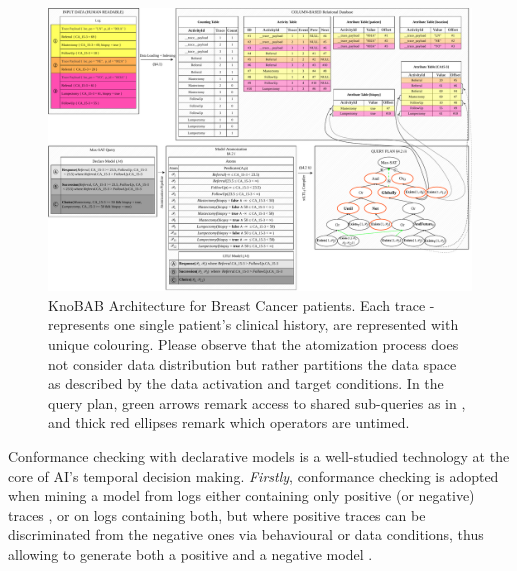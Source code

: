 \begin{figure}
	\centering
	\includegraphics[width=\textwidth]{images/knobab_pipeline.pdf}
	\caption{KnoBAB Architecture for Breast Cancer patients. Each trace - represents one single patient's clinical history, are represented with unique colouring. Please observe that the atomization process does not consider data distribution but rather partitions the data space as described by the data activation and target conditions. In the query plan, green arrows remark access  to shared sub-queries as in \cite{BellatrecheKB21}, and thick red ellipses remark which operators are untimed. } \label{fig:knobab_pipeline}
\end{figure}
Conformance checking with declarative models
{is a well-studied technology at the core} of AI's temporal decision making. \textit{Firstly}, conformance checking is adopted when mining a model from logs either containing only positive (or negative) traces \cite{ROVANI20159236}, or on logs containing both, but where positive traces can be discriminated from the negative ones via behavioural or data conditions, thus allowing to generate both a positive and a negative model  \cite{mining}. 
